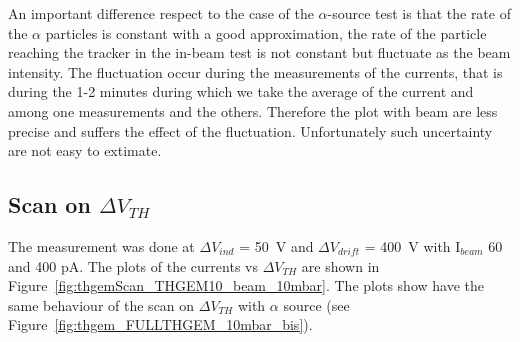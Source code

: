 \documentclass[a4paper, 11 pt]{report}
\newcommand{\Vind}{$\Delta V_{ind}$}
\newcommand{\Vthgem}{$\Delta V_{TH}$}
\newcommand{\Vdrift}{$ \Delta V_{drift}$}
\begin{document}
An important difference respect to the case of the $\alpha$-source test is that the rate
of the $\alpha$ particles is constant with a good approximation, the rate of the
particle reaching the tracker in the in-beam test is not constant but fluctuate
as the beam intensity.
The fluctuation occur during the measurements of the currents, that is during the 1-2 minutes
during which we take the average of the current and among one measurements and the others.
Therefore the plot with beam are less precise and suffers the effect of the fluctuation.
Unfortunately such uncertainty are not easy to extimate.


\subsection{Scan on \Vthgem}
The measurement was done at \Vind{} = 50~V and \Vdrift{} = 400~V with I$_{beam}$ 60 and 400 pA. 
The plots of the currents vs \Vthgem{} are shown in Figure~\ref{fig:thgemScan_THGEM10_beam_10mbar}.
The plots show have the same behaviour of the scan on \Vthgem{} with $\alpha$ source (see Figure~\ref{fig:thgem_FULLTHGEM_10mbar_bis}). 
\end{document}
